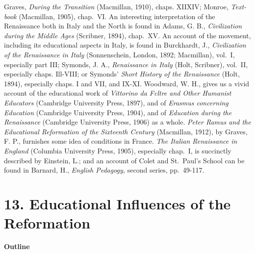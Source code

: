 \documentclass[
]{book}
\begin{document}
Graves, \emph{During the Transition} (Macmillan, 1910), chaps. XIIXIV; Monroe, \emph{Text-book} (Macmillan, 1905), chap.~VI. An interesting interpretation of the Renaissance both in Italy and the North is found in Adams, G. B., \emph{Civilization during the Middle Ages} (Scribner, 1894), chap.~XV. An account of the movement, including its educational aspects in Italy, is found in Burckhardt, J., \emph{Civilization of the Renaissance in Italy} (Sonnenschein, London, 1892; Macmillan), vol.~I, especially part III; Symonds, J. A., \emph{Renaissance in Italy} (Holt, Scribner), vol.~II, especially chaps. Ill-VIII; or Symonds' \emph{Short History of the Renaissance} (Holt, 1894), especially chaps. I and VII, and IX-XI. Woodward, W. H., gives us a vivid account of the educational work of \emph{Vittorino da Fcltre and Other Humanist Educators} (Cambridge University Press, 1897), and of \emph{Erasmus concerning Education} (Cambridge University Press, 1904), and of \emph{Education during the Renaissance} (Cambridge University Press, 1906) as a whole. \emph{Peter Ramus and the Educational Reformation of the Sixteenth Century} (Macmillan, 1912), by Graves, F. P., furnishes some idea of conditions in France. \emph{The Italian Renaissance in England} (Columbia University Press, 1905), especially chap.~I, is succinctly described by Einstein, L.; and an account of Colet and St.~Paul's School can be found in Barnard, H., \emph{English Pedagogy,} second series, pp.~49-117.

\hypertarget{educational-influences-of-the-reformation}{%
\chapter{13. Educational Influences of the Reformation}\label{educational-influences-of-the-reformation}}

\textbf{Outline}
\end{document}
